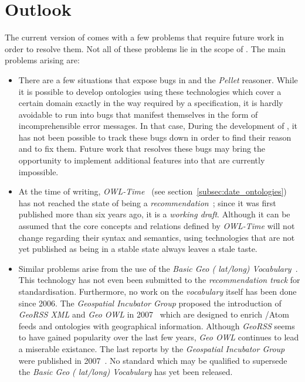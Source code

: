 \vspace{1em}


\section{Outlook}

The current version of \thinkhomeweather comes with a few problems that require future work in order to resolve them. Not all of these problems lie in the scope of \thinkhomeweather. The main problems arising are:

\begin{itemize}
  \item There are a few situations that expose bugs in \protege and the \emph{Pellet} reasoner. While it is possible to develop ontologies using these technologies which cover a certain domain exactly in the way required by a specification, it is hardly avoidable to run into bugs that manifest themselves in the form of incomprehensible error messages. In that case, During the development of \thinkhomeweather, it has not been possible to track these bugs down in order to find their reason and to fix them. Future work that resolves these bugs may bring the opportunity to implement additional features into \thinkhomeweather that are currently impossible.
  
  \item At the time of writing, \emph{OWL-Time}~\cite{owl-time} (see section~\ref{subsec:date_ontologies}) has not reached the state of being a \emph{ recommendation}~\cite{w3c-process}; since it was first published more than six years ago, it is a \emph{working draft}. Although it can be assumed that the core concepts and relations defined by \emph{OWL-Time} will not change regarding their syntax and semantics, using technologies that are not yet published as being in a stable state always leaves a stale taste.
  
  \item Similar problems arise from the use of the \emph{Basic Geo ( lat/long) Vocabulary}~\cite{wgs84_vocabulary}. This technology has not even been submitted to the \emph{ recommendation track} for standardisation. Furthermore, no work on the \emph{ vocabulary} itself has been done since 2006. The \emph{ Geospatial Incubator Group} proposed the introduction of \emph{GeoRSS XML} and \emph{Geo OWL} in 2007~\cite{w3c_geo_report1} which are designed to enrich /Atom feeds and  ontologies with geographical information. Although \emph{GeoRSS} seems to have gained popularity over the last few years, \emph{Geo OWL} continues to lead a miserable existance. The last reports by the \emph{ Geospatial Incubator Group} were published in 2007~\cite{w3c_geo_report1,w3c_geo_report2}. No standard which may be qualified to supersede the \emph{Basic Geo ( lat/long) Vocabulary} has yet been released.
\end{itemize}

